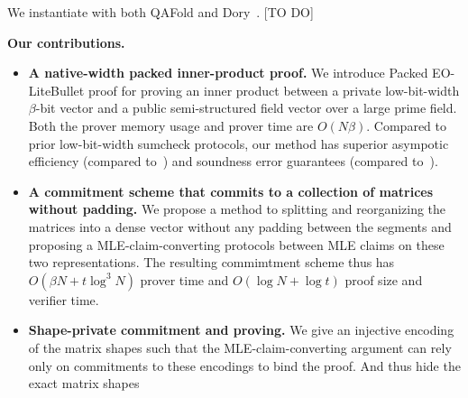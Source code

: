 We instantiate \methodname with both QAFold and Dory~\cite{tcc/Lee21}.
[TO DO]

\smallskip
\noindent\textbf{Our contributions.}
\begin{itemize}[leftmargin=*,labelsep=0.2em,topsep=1pt]

  \item \textbf{A native-width packed inner-product proof.}
  We introduce Packed EO-LiteBullet proof for proving an inner product between a
  private low-bit-width $\beta$-bit vector and a public semi-structured field vector over a large prime field.
  Both the prover memory usage and prover time are $O(N\beta)$.
  Compared to prior low-bit-width sumcheck protocols, our method has superior asympotic efficiency (compared to~\cite{iacr/BagadDT24}) and soundness error guarantees (compared to~\cite{iacr/PackedSumcheck25}).

  \item \textbf{A commitment scheme that commits to a collection of matrices without padding.}
  We propose a method to splitting and reorganizing the matrices into a dense vector without any padding between the segments and proposing a MLE-claim-converting protocols between MLE claims on these two representations.
  The resulting commimtment scheme thus has \(O(\beta N + t\log^3N)\) prover time and $O(\log N + \log t)$ proof size and verifier time.

  \item \textbf{Shape-private commitment and proving.}
  We give an injective encoding of the matrix shapes such that the MLE-claim-converting argument can rely only on commitments to these encodings to bind the proof.
  And thus hide the exact matrix shapes

\end{itemize}
